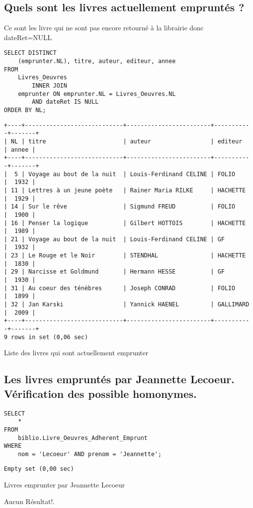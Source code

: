 \documentclass{article}
\begin{document}
\subsection{Quels sont les livres actuellement empruntés ?}
Ce sont les livre qui ne sont pas encore retourné à la librairie donc dateRet=NULL
\begin{listing}[H]
	\begin{verbatim}
SELECT DISTINCT
	(emprunter.NL), titre, auteur, editeur, annee
FROM
	Livres_Oeuvres
		INNER JOIN
	emprunter ON emprunter.NL = Livres_Oeuvres.NL
		AND dateRet IS NULL
ORDER BY NL;
\end{verbatim}
\begin{verbatim}
+----+----------------------------+------------------------+-----------+-------+
| NL | titre                      | auteur                 | editeur   | annee |
+----+----------------------------+------------------------+-----------+-------+
|  5 | Voyage au bout de la nuit  | Louis-Ferdinand CELINE | FOLIO     |  1932 |
| 11 | Lettres à un jeune poète   | Rainer Maria RILKE     | HACHETTE  |  1929 |
| 14 | Sur le rêve                | Sigmund FREUD          | FOLIO     |  1900 |
| 16 | Penser la logique          | Gilbert HOTTOIS        | HACHETTE  |  1989 |
| 21 | Voyage au bout de la nuit  | Louis-Ferdinand CELINE | GF        |  1932 |
| 23 | Le Rouge et le Noir        | STENDHAL               | HACHETTE  |  1830 |
| 29 | Narcisse et Goldmund       | Hermann HESSE          | GF        |  1930 |
| 31 | Au coeur des ténèbres      | Joseph CONRAD          | FOLIO     |  1899 |
| 32 | Jan Karski                 | Yannick HAENEL         | GALLIMARD |  2009 |
+----+----------------------------+------------------------+-----------+-------+
9 rows in set (0,06 sec)
\end{verbatim}
	\caption{Liste des livres qui sont actuellement emprunter}
\end{listing}

\subsection{Les livres empruntés par Jeannette Lecoeur. Vérification des possible homonymes.}
\begin{listing}[H]
\begin{verbatim}
SELECT 
	*
FROM
	biblio.Livre_Oeuvres_Adherent_Emprunt
WHERE
	nom = 'Lecoeur' AND prenom = 'Jeannette';
\end{verbatim}
\begin{verbatim}
Empty set (0,00 sec)
\end{verbatim}
\caption{Livres emprunter par Jeannette Lecoeur}
\end{listing}
Aucun Résultat!.
\end{document}
